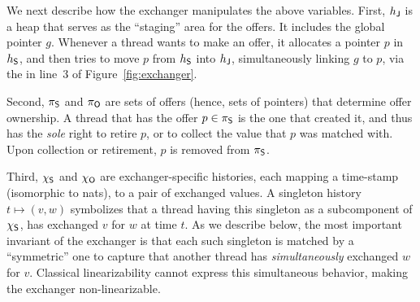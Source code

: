 We next describe how the exchanger manipulates the above variables.
First, $h_{\mathsf{J}}$ is a heap that serves as the ``staging'' area for the
offers. It includes the global pointer $g$. Whenever a thread wants to
make an offer, it allocates a pointer $p$ in $h_{\mathsf{S}}$, and then tries
to move $p$ from $h_{\mathsf{S}}$ into $h_{\mathsf{J}}$, simultaneously linking $g$ to
$p$, via the  in line~3 of Figure~\ref{fig:exchanger}.

Second, $\pi_{\mathsf{S}}$ and $\pi_{\mathsf{O}}$ are sets of offers (hence, sets of
pointers) that determine offer ownership. A thread that has the offer
$p \in \pi_{\mathsf{S}}$ is the one that created it, and thus has the
\emph{sole} right to retire $p$, or to collect the value that $p$ was
matched with. Upon collection or retirement, $p$ is removed from
$\pi_{\mathsf{S}}$.


Third, $\chi_{\mathsf{S}}$ and $\chi_{\mathsf{O}}$ are exchanger-specific histories, each
mapping a time-stamp (isomorphic to nats), to a pair of exchanged
values. A singleton history $t \mapsto (v, w)$ symbolizes that a
thread having this singleton as a subcomponent of $\chi_{\mathsf{S}}$, has
exchanged $v$ for $w$ at time $t$.
%
%
As we describe below, the most important invariant of the exchanger is
that each such singleton is matched by a ``symmetric'' one to capture
that another thread has \emph{simultaneously} exchanged $w$ for
$v$. Classical linearizability cannot express this simultaneous
behavior, making the exchanger non-linearizable.


